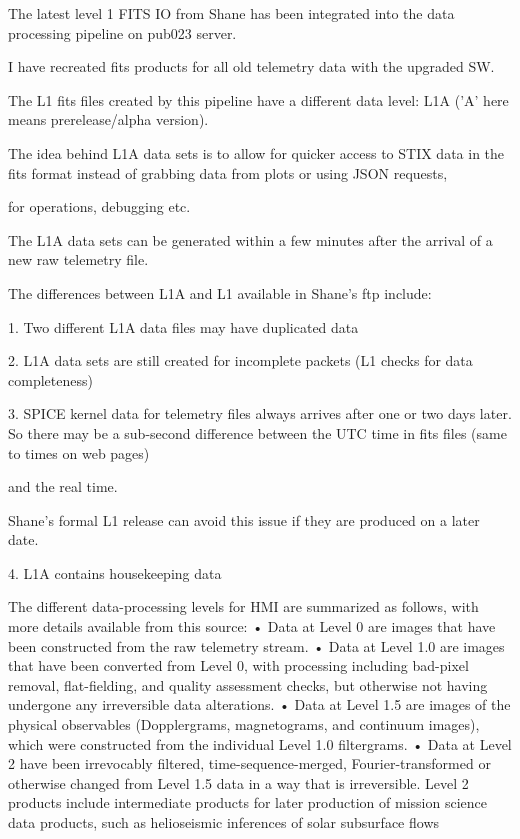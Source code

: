 \documentclass{aa}
\begin{document}
The latest level 1 FITS IO from Shane has been integrated into the data processing pipeline on pub023 server.

I have recreated fits products for all old telemetry data with the upgraded SW.

The L1 fits files  created by this pipeline have a different data level:  L1A ('A' here means  prerelease/alpha version).

The idea behind L1A data sets is to allow for quicker access to STIX data in the fits format instead of grabbing  data from plots or using JSON requests,

for operations,  debugging  etc.

The L1A data sets can be generated within a few minutes after the arrival of a new raw telemetry file.

The differences between L1A and L1 available in Shane's ftp include:

1.  Two different L1A data files may have duplicated data

2.  L1A data sets are still created for incomplete packets  (L1 checks for data completeness)

3.  SPICE kernel data for telemetry files always arrives  after one or two days later.
    So  there may be a sub-second difference between the UTC time in fits files (same to times on web pages)

   and the real time.

    Shane's formal L1 release can avoid this issue if they are produced on a later date.

4. L1A contains housekeeping data

The different data-processing levels for HMI are summarized as follows, with more details available from this source:
• Data at Level 0 are images that have been constructed from the raw telemetry stream.
• Data at Level 1.0 are images that have been converted from Level 0, with processing including bad-pixel removal, flat-fielding,
and quality assessment checks, but otherwise not having undergone any irreversible data alterations.
• Data at Level 1.5 are images of the physical observables (Dopplergrams, magnetograms, and continuum images), which were
constructed from the individual Level 1.0 filtergrams.
• Data at Level 2 have been irrevocably filtered, time-sequence-merged, Fourier-transformed or otherwise changed from Level 1.5
data in a way that is irreversible. Level 2 products include intermediate products for later production of mission science data
products, such as helioseismic inferences of solar subsurface flows
\end{document}
